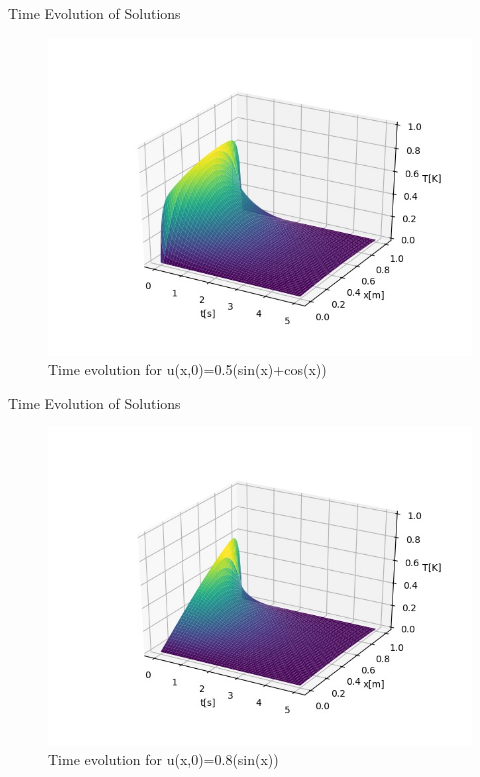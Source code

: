 \documentclass[10pt,compress]{beamer}
\begin{document}
\begin{frame}{Time Evolution of Solutions}
\begin{figure}
\begin{center}
	\includegraphics[scale=0.5]{../plots/evol2_0500_2000.jpg}
	\caption{Time evolution for u(x,0)=0.5(sin(x)+cos(x))}
	\label{fig:sin-cos-evol}
\end{center}
\end{figure}
\end{frame}

\begin{frame}{Time Evolution of Solutions}
\begin{figure}
\begin{center}
	\includegraphics[scale=0.5]{../plots/evol0_0500_2000.jpg}
	\caption{Time evolution for u(x,0)=0.8(sin(x))}
	\label{fig:sin-evol}
\end{center}
\end{figure}
\end{frame}
\end{document}
